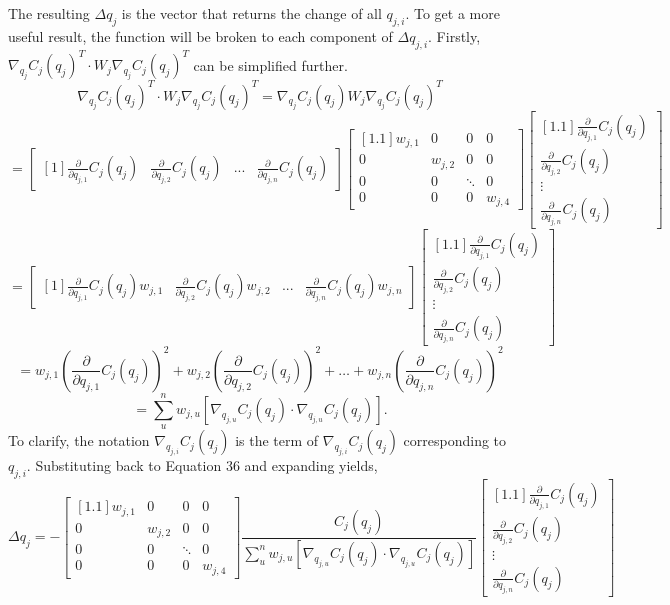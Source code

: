 \documentclass[12pt, letterpaper]{article}
\begin{document}
The resulting $\Delta q_j$ is the vector that returns the change of all $q_{j,i}$. To get a more useful result, the function will be broken to each component of $\Delta q_{j,i}$. Firstly, $\nabla_{q_j} C_j(q_j)^{T} \cdot W_j \nabla_{q_j} C_j(q_j)^{T}$ can be simplified further.
$$\nabla_{q_j} C_j(q_j)^{T} \cdot W_j \nabla_{q_j} C_j(q_j)^{T} = \nabla_{q_j} C_j(q_j) W_j \nabla_{q_j} C_j(q_j)^{T}$$
$$=\begin{bmatrix}[1]\frac{\partial}{\partial q_{j,1}} C_j(q_j)&\frac{\partial}{\partial q_{j,2}}C_j(q_j)& . . .&\frac{\partial}{\partial q_{j,n}}C_j(q_j)\end{bmatrix}\begin{bmatrix}[1.1] w_{j,1}&0&0&0\\0&w_{j,2}&0&0\\0&0&\ddots&0\\0&0&0&w_{j,4}\end{bmatrix}  \begin{bmatrix}[1.1]\frac{\partial}{\partial q_{j,1}}C_j(q_j)\\\frac{\partial}{\partial q_{j,2}}C_j(q_j)\\\vdots\\\frac{\partial}{\partial q_{j,n}}C_j(q_j)\end{bmatrix}$$
$$=\begin{bmatrix}[1] \frac{\partial}{\partial q_{j,1}} C_j(q_j) w_{j,1}&\frac{\partial}{\partial q_{j,2}}C_j(q_j) w_{j,2}& . . .&\frac{\partial}{\partial q_{j,n}}C_j(q_j) w_{j,n}\end{bmatrix}\begin{bmatrix}[1.1]\frac{\partial}{\partial q_{j,1}}C_j(q_j)\\\frac{\partial}{\partial q_{j,2}}C_j(q_j)\\\vdots\\\frac{\partial}{\partial q_{j,n}}C_j(q_j)\end{bmatrix}$$
$$=w_{j,1}\left( \frac{\partial}{\partial q_{j,1}} C_j(q_j) \right) ^{2} + w_{j,2} \left( \frac{\partial}{\partial q_{j,2}} C_j(q_j) \right) ^{2} + \dots + w_{j,n} \left( \frac{\partial}{\partial q_{j,n}} C_j(q_j) \right) ^{2} $$
\begin{equation}
   =  \sum\limits_{u}^{n} w_{j,u}[\nabla_{q_{j,u}} C_j(q_j) \cdot \nabla_{q_{j,u}} C_j(q_j)]. 
\end{equation}
To clarify, the notation $\nabla_{q_{j,i}} C_j(q_j)$ is the term of $\nabla_{q_{j,i}} C_j(q_j)$ corresponding to $q_{j,i}$. Substituting back to Equation 36 and expanding yields,
$$\Delta q_j = -\begin{bmatrix}[1.1]w_{j,1}&0&0&0\\0&w_{j,2}&0&0\\0&0&\ddots&0\\0&0&0&w_{j,4}\end{bmatrix} \frac{C_j(q_j)}{\sum\limits_{u}^{n} w_{j,u}[\nabla_{q_{j,u}} C_j(q_j) \cdot \nabla_{q_{j,u}} C_j(q_j)]} \begin{bmatrix}[1.1]\frac{\partial}{\partial q_{j,1}} C_j(q_j)\\\frac{\partial}{\partial q_{j,2}} C_j(q_j) \\ \vdots\\\frac{\partial}{\partial q_{j,n}}C_j(q_j)\end{bmatrix}$$
\end{document}
